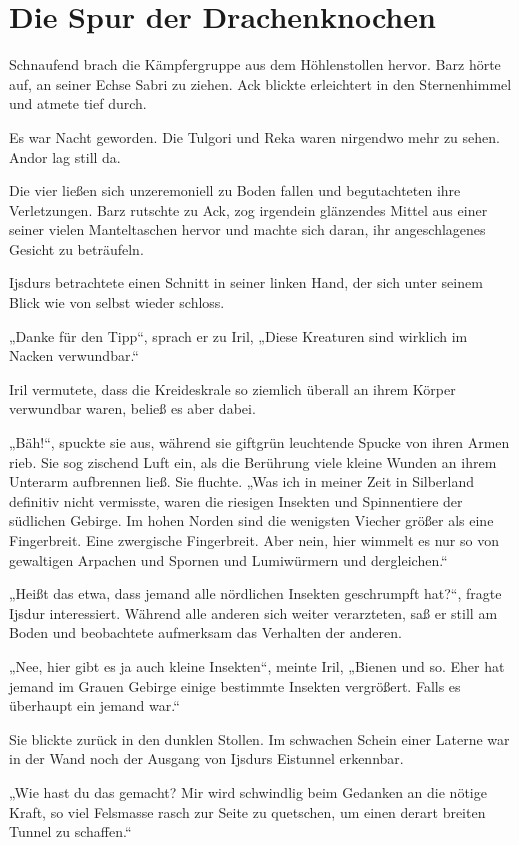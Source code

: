 \newpage
\section{Die Spur der Drachenknochen}


Schnaufend brach die Kämpfergruppe aus dem Höhlenstollen hervor. Barz hörte auf, an seiner Echse Sabri zu ziehen. Ack blickte erleichtert in den Sternenhimmel und atmete tief durch.

Es war Nacht geworden. Die Tulgori und Reka waren nirgendwo mehr zu sehen. Andor lag still da.

Die vier ließen sich unzeremoniell zu Boden fallen und begutachteten ihre Verletzungen. Barz rutschte zu Ack, zog irgendein glänzendes Mittel aus einer seiner vielen Manteltaschen hervor und machte sich daran, ihr angeschlagenes Gesicht zu beträufeln.

Ijsdurs betrachtete einen Schnitt in seiner linken Hand, der sich unter seinem Blick wie von selbst wieder schloss.

„Danke für den Tipp“, sprach er zu Iril, „Diese Kreaturen sind wirklich im Nacken verwundbar.“

Iril vermutete, dass die Kreideskrale so ziemlich überall an ihrem Körper verwundbar waren, beließ es aber dabei.

„Bäh!“, spuckte sie aus, während sie giftgrün leuchtende Spucke von ihren Armen rieb. Sie sog zischend Luft ein, als die Berührung viele kleine Wunden an ihrem Unterarm aufbrennen ließ. Sie fluchte. „Was ich in meiner Zeit in Silberland definitiv nicht vermisste, waren die riesigen Insekten und Spinnentiere der südlichen Gebirge. Im hohen Norden sind die wenigsten Viecher größer als eine Fingerbreit. Eine zwergische Fingerbreit. Aber nein, hier wimmelt es nur so von gewaltigen Arpachen und Spornen und Lumiwürmern und dergleichen.“

„Heißt das etwa, dass jemand alle nördlichen Insekten geschrumpft hat?“, fragte Ijsdur interessiert. Während alle anderen sich weiter verarzteten, saß er still am Boden und beobachtete aufmerksam das Verhalten der anderen.

„Nee, hier gibt es ja auch kleine Insekten“, meinte Iril, „Bienen und so. Eher hat jemand im Grauen Gebirge einige bestimmte Insekten vergrößert. Falls es überhaupt ein jemand war.“

Sie blickte zurück in den dunklen Stollen. Im schwachen Schein einer Laterne war in der Wand noch der Ausgang von Ijsdurs Eistunnel erkennbar.

„Wie hast du das gemacht? Mir wird schwindlig beim Gedanken an die nötige Kraft, so viel Felsmasse rasch zur Seite zu quetschen, um einen derart breiten Tunnel zu schaffen.“

